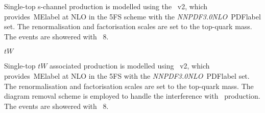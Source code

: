 Single-top s-channel production is modelled using the \POWHEGBOX~v2, which provides~\acrshort{MElabel} at NLO in the 5FS scheme with the \textit{NNPDF3.0NLO}~\acrshort{PDFlabel} set. The renormalisation and factorisation scales are set to the top-quark mass. The events are showered with \PYTHIA~8.

\textit{$tW$}

Single-top $tW$ associated production is modelled using \POWHEGBOX~v2, which provides~\acrshort{MElabel} at NLO in the 5FS with the \textit{NNPDF3.0NLO}~\acrshort{PDFlabel} set. The renormalisation and factorisation scales are set to the top-quark mass. The diagram removal scheme is employed to handle the interference with \ttbar\ production. %
The events are showered with \PYTHIA~8.

